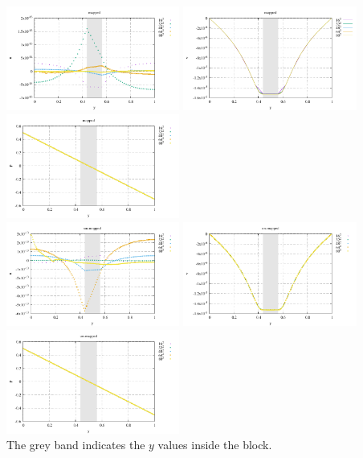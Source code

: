 \begin{center}
\includegraphics[width=5.7cm]{python_codes/fieldstone_76/results/block/profile_m1_u.pdf}
\includegraphics[width=5.7cm]{python_codes/fieldstone_76/results/block/profile_m1_v.pdf}
\includegraphics[width=5.7cm]{python_codes/fieldstone_76/results/block/profile_m1_p.pdf}\\
\includegraphics[width=5.7cm]{python_codes/fieldstone_76/results/block/profile_m2_u.pdf}
\includegraphics[width=5.7cm]{python_codes/fieldstone_76/results/block/profile_m2_v.pdf}
\includegraphics[width=5.7cm]{python_codes/fieldstone_76/results/block/profile_m2_p.pdf}\\
{\captionfont The grey band indicates the $y$ values inside the block.}
\end{center}

